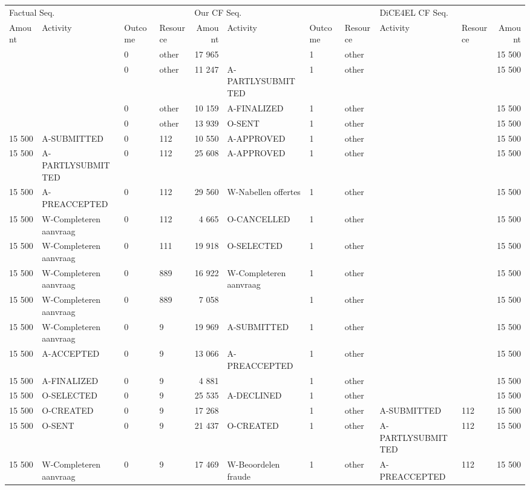 \begin{tabular}{llllrlllllr}
\toprule
\multicolumn{4}{l}{Factual Seq.} & \multicolumn{4}{l}{Our CF Seq.} & \multicolumn{3}{l}{DiCE4EL CF Seq.} \\
Amount & Activity & Outcome & Resource & Amount & Activity & Outcome & Resource & Activity & Resource & Amount \\
\midrule
 &  & 0 & other & 17 965 &  & 1 & other &  &  & 15 500 \\
 &  & 0 & other & 11 247 & A-PARTLYSUBMITTED & 1 & other &  &  & 15 500 \\
 &  & 0 & other & 10 159 & A-FINALIZED & 1 & other &  &  & 15 500 \\
 &  & 0 & other & 13 939 & O-SENT & 1 & other &  &  & 15 500 \\
15 500 & A-SUBMITTED & 0 & 112 & 10 550 & A-APPROVED & 1 & other &  &  & 15 500 \\
15 500 & A-PARTLYSUBMITTED & 0 & 112 & 25 608 & A-APPROVED & 1 & other &  &  & 15 500 \\
15 500 & A-PREACCEPTED & 0 & 112 & 29 560 & W-Nabellen offertes & 1 & other &  &  & 15 500 \\
15 500 & W-Completeren aanvraag & 0 & 112 & 4 665 & O-CANCELLED & 1 & other &  &  & 15 500 \\
15 500 & W-Completeren aanvraag & 0 & 111 & 19 918 & O-SELECTED & 1 & other &  &  & 15 500 \\
15 500 & W-Completeren aanvraag & 0 & 889 & 16 922 & W-Completeren aanvraag & 1 & other &  &  & 15 500 \\
15 500 & W-Completeren aanvraag & 0 & 889 & 7 058 &  & 1 & other &  &  & 15 500 \\
15 500 & W-Completeren aanvraag & 0 & 9 & 19 969 & A-SUBMITTED & 1 & other &  &  & 15 500 \\
15 500 & A-ACCEPTED & 0 & 9 & 13 066 & A-PREACCEPTED & 1 & other &  &  & 15 500 \\
15 500 & A-FINALIZED & 0 & 9 & 4 881 &  & 1 & other &  &  & 15 500 \\
15 500 & O-SELECTED & 0 & 9 & 25 535 & A-DECLINED & 1 & other &  &  & 15 500 \\
15 500 & O-CREATED & 0 & 9 & 17 268 &  & 1 & other & A-SUBMITTED & 112 & 15 500 \\
15 500 & O-SENT & 0 & 9 & 21 437 & O-CREATED & 1 & other & A-PARTLYSUBMITTED & 112 & 15 500 \\
15 500 & W-Completeren aanvraag & 0 & 9 & 17 469 & W-Beoordelen fraude & 1 & other & A-PREACCEPTED & 112 & 15 500 \\

\end{tabular}
